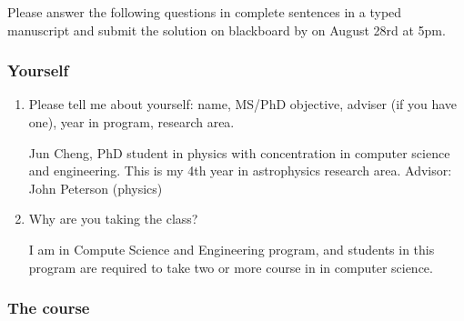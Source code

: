 \documentclass{article}
\begin{document}
 
Please answer the following questions in complete sentences in a typed manuscript and submit the solution on blackboard by on August 28rd at 5pm.

\hypertarget{yourself_1}{}\subsubsection*{{Yourself}}\label{yourself_1}

\begin{enumerate}%
\item Please tell me about yourself: name, MS/PhD objective, adviser (if you have one), year in program, research area.

Jun Cheng,   PhD student in physics with concentration in computer science and engineering. This is my 4th year in astrophysics research area.  Advisor: John Peterson (physics) 


\item Why are you taking the class?

I am in Compute Science and Engineering program, and students in this program are required to take two or more course in in computer science. 

\end{enumerate}
\hypertarget{the_course_2}{}\subsubsection*{{The course}}\label{the_course_2}
\end{document}
